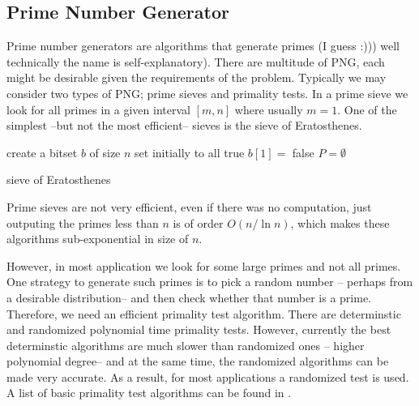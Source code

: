 \documentclass{article}
\DeclarePairedDelimiter{\floorp}{\lfloor}{\rfloor}
\newcommand{\floor}[1]{\floorp{#1}}
\begin{document}
\subsection{Prime Number Generator}
Prime number generators are algorithms that generate primes (I guess :))) well technically the name is self-explanatory). There are multitude of PNG, each might be desirable given the requirements of the problem. Typically we may consider two types of PNG; prime sieves and primality tests. In a prime sieve we look for all primes in a given interval \([m,n]\) where usually \(m = 1\). One of the simplest --but not the most efficient-- sieves is the sieve of Eratosthenes. 
\begin{algorithm}
	\DontPrintSemicolon
	create a bitset \(b\) of size \(n\) set initially to all true\;
	\(b[1] =\) false\;
	\(P = \emptyset\)\;
	\For{\(i = 2, \dots, n\)}{
	\If{\(b[i]\) is true}{
		\(P = P \cup \{i\}\)\;
		\For{\(j = 2i, \dots, \floor{\frac{n}{i}}i \)}{
			\(b[j] =\) false\;
		}
	}
	}
	\caption{sieve of Eratosthenes}
\end{algorithm}
Prime sieves are not very efficient, even if there was no computation, just outputing the primes less than \(n\) is of order \(O(n/\ln n)\), which makes these algorithms sub-exponential in size of \(n\). 

However, in most application we look for some large primes and not all primes. One  strategy to generate such primes is to pick a random number -- perhaps from a desirable distribution-- and then check whether that number is a prime. Therefore, we need an efficient primality test algorithm. There are determinstic and randomized polynomial time primality tests. However, currently the best determinstic algorithms are much slower than randomized ones -- higher polynomial degree-- and at the same time, the randomized algorithms can be made very accurate. As a result, for most applications a randomized test is used. A list of basic primality test algorithms can be found in \cite{das}.
\end{document}

